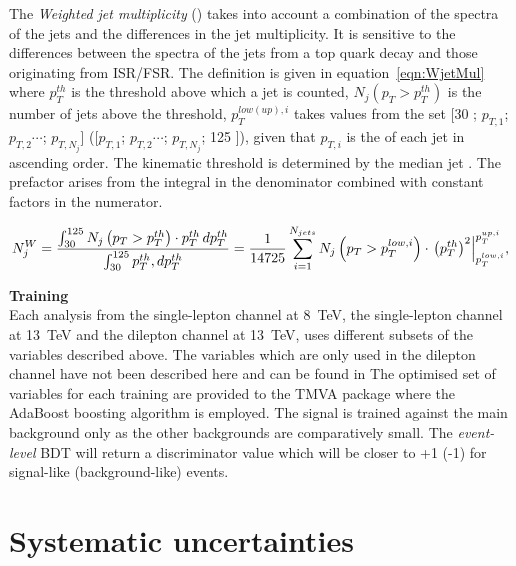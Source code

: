 The \emph{Weighted jet multiplicity} (\njetsw) takes into account a combination of the \pt spectra of the jets and the differences in the jet multiplicity. It is sensitive to the differences between the \pt spectra of the jets from a top quark decay and those originating from ISR/FSR. The \njetsw definition is given in equation~\ref{eqn:WjetMul} where $p_T^{th}$ is the \pt threshold above which a jet is counted, $N_j\left(p_T > p_T^{th}\right)$ is the number of jets above the \pt threshold, $p_T^{low(up),i}$ takes values from the set [30 \GeV; $p_{T,1}$; $p_{T,2}\cdots$; $p_{T,N_j}$] ([$p_{T,1}$; $p_{T,2}\cdots$; $p_{T,N_j}$; 125 \GeV]), given that $p_{T,i}$ is the \pt of each jet in ascending order. The kinematic threshold is determined by the median jet \pt. The prefactor arises from the integral in the denominator combined with constant factors in the numerator.

\begin{equation}
N_j^W = \frac{\int_{30}^{125}{N_j\left(p_T > p_T^{th}\right)\cdot p_T^{th}\,dp_T^{th}}} {\int_{30}^{125}{ p_T^{th}\\
,dp_T^{th}}} = \frac{1}{14725}\sum_{i=1}^{N_{jets}}{N_j\left(p_T>p_T^{low,i}\right)\cdot\left.\left(p_T^{th}\right)^2\right|^{p_T^{up,i}}_{p_T^{low,i}}},  
\label{eqn:WjetMul}
\end{equation} 


\textbf{Training}\\
Each analysis from the single-lepton channel at 8~TeV, the single-lepton channel at 13~TeV and the dilepton channel at 13~TeV, uses different subsets of the variables described above. The variables which are only used in the dilepton channel have not been described here and can be found in  The optimised set of variables for each training are provided to the TMVA package where the AdaBoost boosting algorithm is employed. The \tttt signal is trained against the main \ttbar background only as the other backgrounds are comparatively small. The \emph{event-level} BDT will return a discriminator value which will be closer to +1 (-1) for signal-like (background-like) events.

\section{Systematic uncertainties}
\label{sec:uncertainties}

